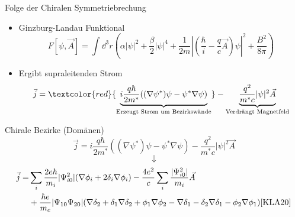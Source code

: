 \begin{frame}{Folge der Chiralen Symmetriebrechung}
    \begin{itemize}
        \item Ginzburg-Landau Funktional \[ F[\psi, \vec{A}] = \int \dd^3 r \left( \alpha |\psi|^2 + \frac{\beta}{2} |\psi|^4 + \frac{1}{2m} \left|\left(\frac{\hbar}{i} - \frac{q}{c} \vec{A} \right)\psi\right|^2 + \frac{B^2}{8\pi} \right) \]
        \item Ergibt supraleitenden Strom
              \[\vec{j} = \textcolor{red}{\underbrace{i \frac{q\hbar}{2m^*} ((\nabla \psi^*)\psi - \psi^*\nabla\psi)}_{\text{Erzeugt Strom um Bezirkswände}}}-\underbrace{\frac{q^2}{m^*c} |\psi|^2\vec{A}}_{\text{Verdrängt Magnetfeld}}\]
    \end{itemize}
\end{frame}

\begin{frame}{Chirale Bezirke (Domänen)}
    \[\vec{j} = i \frac{q\hbar}{2m^*} ((\nabla \psi^*)\psi - \psi^*\nabla\psi)-\frac{q^2}{m^*c} |\psi|^2\vec{A}\]
    \[\downarrow\]
    \begin{align*}
        \vec{j} = & \sum_i \frac{2 e \hbar}{m_i} |\Psi_{i0}^2| (\nabla \phi_i + 2 \delta_i \nabla \phi_i) - \frac{4e^2}{c} \sum_i \frac{|\Psi_{i0}^2|}{m_i} \vec{A}                                                         \\
                  & + \frac{\hbar e}{m_c} |\Psi_{10} \Psi_{20}| (\nabla \delta_2 + \delta_1 \nabla \delta_2 + \phi_1 \nabla \phi_2 - \nabla \delta_1 - \delta_2 \nabla \delta_1 - \phi_2 \nabla \phi_1) \text{\cite{KLA20}}
    \end{align*}
\end{frame}

